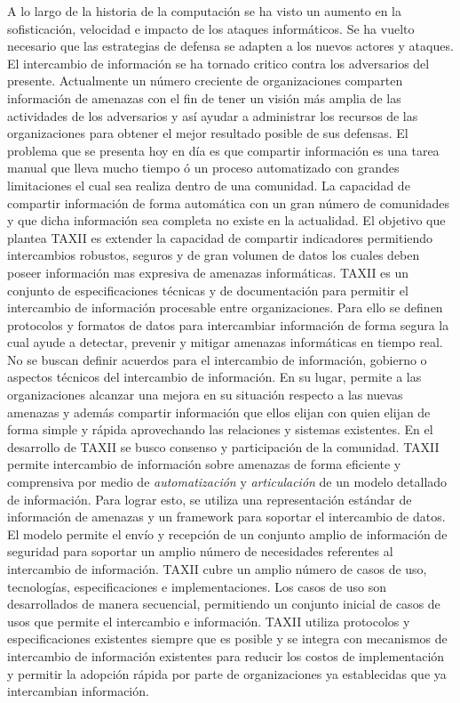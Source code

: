 A lo largo de la historia de la computación se ha visto un aumento en la 
sofisticación, velocidad e impacto de los ataques informáticos. Se ha vuelto 
necesario que las estrategias de defensa se adapten a los nuevos actores y 
ataques.
El intercambio de información se ha tornado critico contra los adversarios del 
presente. Actualmente un número creciente de organizaciones comparten 
información de amenazas con el fin de tener un visión más amplia de las 
actividades de los adversarios y así ayudar a administrar los recursos de las 
organizaciones para obtener el mejor resultado posible de sus defensas. El 
problema que se presenta hoy en día es que compartir información es una tarea 
manual que lleva mucho tiempo ó un proceso automatizado con grandes limitaciones 
el cual sea realiza dentro de una comunidad. La capacidad de compartir 
información de forma automática con un gran número de comunidades y que dicha información sea 
completa no existe en la actualidad. El objetivo que plantea TAXII es extender 
la capacidad de compartir indicadores permitiendo intercambios robustos, seguros 
y de gran volumen de datos los cuales deben poseer información mas expresiva de 
amenazas informáticas.
TAXII es un conjunto de especificaciones técnicas y de documentación para 
permitir el intercambio de información procesable entre organizaciones. Para 
ello se definen protocolos y formatos de datos para intercambiar información de 
forma segura la cual ayude a detectar, prevenir y mitigar amenazas informáticas 
en tiempo real. No se buscan definir acuerdos para el intercambio de 
información, gobierno o aspectos técnicos del intercambio de información. En su 
lugar, permite a las organizaciones alcanzar una mejora en su situación respecto 
a las nuevas amenazas y además compartir información que ellos elijan con quien 
elijan de forma simple y rápida aprovechando las relaciones y sistemas 
existentes.
En el desarrollo de TAXII se busco consenso y participación de la comunidad. 
TAXII permite intercambio de información sobre amenazas de forma eficiente y 
comprensiva por medio de \emph{automatización} y \emph{articulación} de un 
modelo detallado de información. Para lograr esto, se utiliza una representación 
estándar de información de amenazas y un framework para soportar el intercambio 
de datos. El modelo permite el envío y recepción de un conjunto amplio de 
información de seguridad para soportar un amplio número de necesidades 
referentes al intercambio de información.
TAXII cubre un amplio número de casos de uso, tecnologías, especificaciones e 
implementaciones. Los casos de uso son desarrollados de manera secuencial, 
permitiendo un conjunto inicial de casos de usos que permite el intercambio e 
información. TAXII utiliza protocolos y especificaciones existentes siempre que 
es posible y se integra con mecanismos de intercambio de información existentes 
para reducir los costos de implementación y permitir la adopción rápida por 
parte de organizaciones ya establecidas que ya intercambian información.


